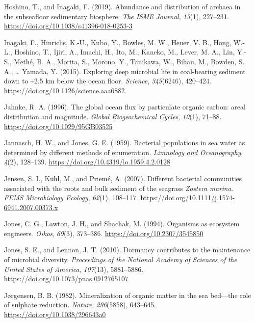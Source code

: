 \documentclass[
  12 pt,
]{book}
\newlength{\cslhangindent}
\newlength{\cslentryspacingunit} %
\newenvironment{CSLReferences}[2] %
 {%
  \setlength{\parindent}{0pt}
  \ifodd #1
  \let\oldpar\par
  \def\par{\hangindent=\cslhangindent\oldpar}
  \fi
  \setlength{\parskip}{#2\cslentryspacingunit}
 }%
 {}
\begin{document}
\begin{CSLReferences}{1}{0}
\leavevmode{}%
Hoshino, T., and Inagaki, F. (2019). Abundance and distribution of archaea in the subseafloor sedimentary biosphere. \emph{The ISME Journal}, \emph{13}(1), 227--231. \url{https://doi.org/10.1038/s41396-018-0253-3}

\leavevmode{}%
Inagaki, F., Hinrichs, K.-U., Kubo, Y., Bowles, M. W., Heuer, V. B., Hong, W.-L., Hoshino, T., Ijiri, A., Imachi, H., Ito, M., Kaneko, M., Lever, M. A., Lin, Y.-S., Methé, B. A., Morita, S., Morono, Y., Tanikawa, W., Bihan, M., Bowden, S. A., \ldots{} Yamada, Y. (2015). Exploring deep microbial life in coal-bearing sediment down to \textasciitilde2.5 km below the ocean floor. \emph{Science}, \emph{349}(6246), 420--424. \url{https://doi.org/10.1126/science.aaa6882}

\leavevmode{}%
Jahnke, R. A. (1996). The global ocean flux by particulate organic carbon: areal distribution and magnitude. \emph{Global Biogeochemical Cycles}, \emph{10}(1), 71--88. \url{https://doi.org/10.1029/95GB03525}

\leavevmode{}%
Jannasch, H. W., and Jones, G. E. (1959). Bacterial populations in sea water as determined by different methods of enumeration. \emph{Limnology and Oceanography}, \emph{4}(2), 128--139. \url{https://doi.org/10.4319/lo.1959.4.2.0128}

\leavevmode{}%
Jensen, S. I., Kühl, M., and Priemé, A. (2007). Different bacterial communities associated with the roots and bulk sediment of the seagrass {{\emph{Zostera marina}}}. \emph{FEMS Microbiology Ecology}, \emph{62}(1), 108--117. \url{https://doi.org/10.1111/j.1574-6941.2007.00373.x}

\leavevmode{}%
Jones, C. G., Lawton, J. H., and Shachak, M. (1994). Organisms as ecosystem engineers. \emph{Oikos}, \emph{69}(3), 373--386. \url{https://doi.org/10.2307/3545850}

\leavevmode{}%
Jones, S. E., and Lennon, J. T. (2010). Dormancy contributes to the maintenance of microbial diversity. \emph{Proceedings of the National Academy of Sciences of the United States of America}, \emph{107}(13), 5881--5886. \url{https://doi.org/10.1073/pnas.0912765107}

\leavevmode{}%
Jørgensen, B. B. (1982). Mineralization of organic matter in the sea bed---the role of sulphate reduction. \emph{Nature}, \emph{296}(5858), 643--645. \url{https://doi.org/10.1038/296643a0}


\end{CSLReferences}
\end{document}
